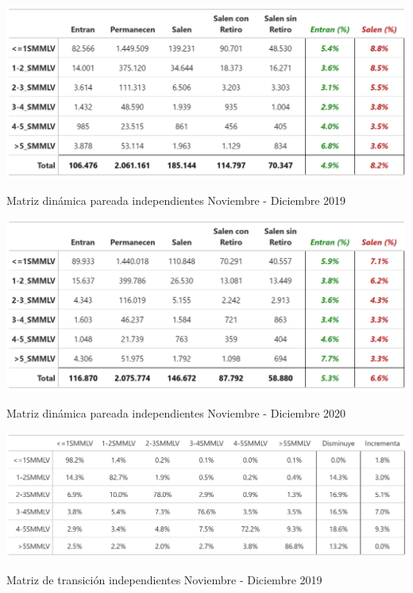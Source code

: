 
\begin{table}[!h]
\centering
\includegraphics[width = 15cm]{results/02_longitudinal/salida_resumen_independientes_interes_19.png}
\caption{Matriz dinámica pareada independientes Noviembre - Diciembre 2019}%
\label{tabla:independientes:matriz_dinamica_mes_interes_19}
\end{table}

\begin{table}[!h]
\centering
\includegraphics[width = 15cm]{results/02_longitudinal/salida_resumen_independientes_interes_20.png}
\caption{Matriz dinámica pareada independientes Noviembre - Diciembre 2020}%
\label{tabla:independientes:matriz_dinamica_mes_interes_20}
\end{table}

\begin{table}[!h]
\centering
\includegraphics[width = 15cm]{results/02_longitudinal/salida_matriz_transicion_independientes_19.png}
\caption{Matriz de transición independientes Noviembre - Diciembre 2019}%
\label{tabla:independientes:matriz_transicion_mes_interes_19}
\end{table}

